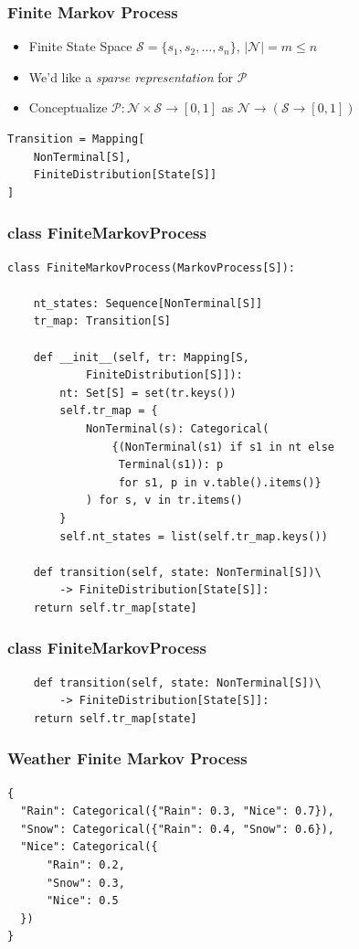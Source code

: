 \documentclass[handout]{beamer}
\begin{document}
\begin{frame}[fragile]
\frametitle{Finite Markov Process}
\pause
\begin{itemize}[<+->]
\item Finite State Space $\mathcal{S} = \{s_1, s_2, \ldots, s_n\}$, $|\mathcal{N}| = m\leq n$
\item We'd like a {\em sparse representation} for $\mathcal{P}$
\item Conceptualize $\mathcal{P} : \mathcal{N} \times \mathcal{S} \rightarrow [0, 1]$ as $\mathcal{N} \rightarrow (\mathcal{S} \rightarrow [0, 1])$
\end{itemize}
\pause
\begin{lstlisting}
Transition = Mapping[
    NonTerminal[S],
    FiniteDistribution[State[S]]
]
\end{lstlisting}
\end{frame}


\begin{frame}[fragile]
\frametitle{class FiniteMarkovProcess}
\pause
\begin{lstlisting}
class FiniteMarkovProcess(MarkovProcess[S]):

    nt_states: Sequence[NonTerminal[S]]
    tr_map: Transition[S]

    def __init__(self, tr: Mapping[S,
            FiniteDistribution[S]]):
        nt: Set[S] = set(tr.keys())
        self.tr_map = {
            NonTerminal(s): Categorical(
                {(NonTerminal(s1) if s1 in nt else
                 Terminal(s1)): p
                 for s1, p in v.table().items()}
            ) for s, v in tr.items()
        }
        self.nt_states = list(self.tr_map.keys())
        
    def transition(self, state: NonTerminal[S])\
        -> FiniteDistribution[State[S]]:
    return self.tr_map[state]
\end{lstlisting}
\end{frame}

\begin{frame}[fragile]
\frametitle{class FiniteMarkovProcess}
\pause
\begin{lstlisting}        
    def transition(self, state: NonTerminal[S])\
        -> FiniteDistribution[State[S]]:
    return self.tr_map[state]
\end{lstlisting}
\end{frame}


\begin{frame}[fragile]
\frametitle{Weather Finite Markov Process}
\begin{lstlisting}       
{
  "Rain": Categorical({"Rain": 0.3, "Nice": 0.7}),
  "Snow": Categorical({"Rain": 0.4, "Snow": 0.6}),
  "Nice": Categorical({
      "Rain": 0.2,
      "Snow": 0.3,
      "Nice": 0.5
  })
}
\end{lstlisting}
\end{frame}
\end{document}
